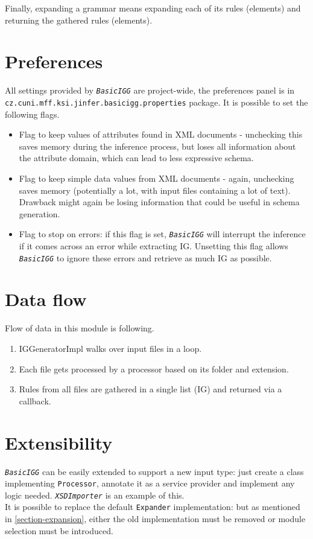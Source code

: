 \documentclass[a4paper,10pt,oneside]{article}
\newcommand{\code}[1]{\texttt{#1}}
\newcommand{\jmodule}[1]{\texttt{\textit{#1}}}
\begin{document}
Finally, expanding a grammar means expanding each of its rules (elements) and returning the gathered rules (elements).

\section{Preferences}

All settings provided by \jmodule{BasicIGG} are project-wide, the preferences panel is in \code{cz.cuni.mff.ksi.jinfer.basicigg.properties} package. It is possible to set the following flags. 
\begin{itemize}
	\item Flag to keep values of attributes found in XML documents - unchecking this saves memory during the inference process, but loses all information about the attribute domain, which can lead to less expressive schema.
	\item Flag to keep simple data values from XML documents - again, unchecking saves memory (potentially a lot, with input files containing a lot of text). Drawback might again be losing information that could be useful in schema generation.
	\item Flag to stop on errors: if this flag is set, \jmodule{BasicIGG} will interrupt the inference if it comes across an error while extracting IG. Unsetting this flag allows \jmodule{BasicIGG} to ignore these errors and retrieve as much IG as possible.
\end{itemize}

\section{Data flow}

Flow of data in this module is following.
\begin{enumerate}
	\item IGGeneratorImpl walks over input files in a loop.
	\item Each file gets processed by a processor based on its folder and extension.
	\item Rules from all files are gathered in a single list (IG) and returned via a callback.
\end{enumerate}

\section{Extensibility}

\jmodule{BasicIGG} can be easily extended to support a new input type: just create a class implementing \code{Processor}, annotate it as a service provider and implement any logic needed. \jmodule{XSDImporter} is an example of this.\\

It is possible to replace the default \code{Expander} implementation: but as mentioned in \ref{section-expansion}, either the old implementation must be removed or module selection must be introduced.

\cite{ahonen}
\newpage


\end{document}
